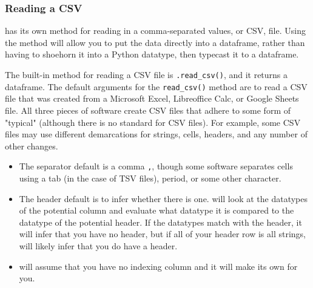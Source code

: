 \subsubsection{Reading a CSV}
 has its own method for reading in a comma-separated values, or CSV, file. Using the  method will allow you to put the data directly into a  dataframe, rather than having to shoehorn it into a Python datatype, then typecast it to a  dataframe.\par
{}
The built-in  method for reading a CSV file is \verb|.read_csv()|, and it returns a  dataframe. The default arguments for the \verb|read_csv()| method are to read a CSV file that was created from a Microsoft Excel, Libreoffice Calc, or Google Sheets file. All three pieces of software create CSV files that adhere to some form of "typical" (although there is no standard for CSV files). For example, some CSV files may use different demarcations for strings, cells, headers, and any number of other changes.
\begin{itemize}
    \item The separator default is a comma \verb|,|, though some software separates cells using a tab (in the case of TSV files), period, or some other character.
    \item The header default is to infer whether there is one.  will look at the datatypes of the potential column and evaluate what datatype it is compared to the datatype of the potential header. If the datatypes match with the header, it will infer that you have no header, but if all of your header row is all strings,  will likely infer that you do have a header.
    \item {} will assume that you have no indexing column and it will make its own for you.
\end{itemize}
